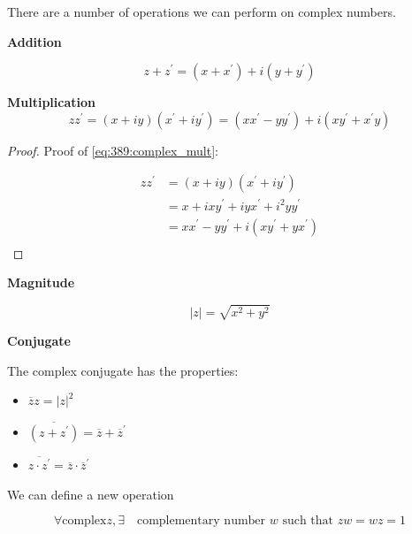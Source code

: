 \documentclass[10pt]{article}
\begin{document}
\begin{definition}

	There are a number of operations we can perform on complex numbers.

	\textbf{Addition} 

	\begin{equation}
		z + z^\prime = (x + x^\prime) + i(y + y^\prime)
		\label{eq:389:complex_add}
	\end{equation}


	\textbf{Multiplication} 
	\begin{equation}
		z z^\prime = (x + iy)(x^\prime + iy^\prime) = (x x^\prime - y y^\prime) + i(x y^\prime + x^\prime y)
		\label{eq:389:complex_mult}
	\end{equation}


	\begin{proof}
		Proof of \eqref{eq:389:complex_mult}:

		\begin{equation}
			\begin{split}
				zz^\prime &= (x+iy)(x^\prime + iy^\prime) \\
				 &= x + ixy^\prime + i yx^\prime + i^2yy^\prime\\
				 &= x x^\prime  - yy^\prime + i(xy^\prime + y x ^\prime) \\
			\end{split}
		\end{equation}
	\end{proof}


	\textbf{Magnitude} 

	\begin{equation}
		|z| = \sqrt{x^2 + y^2}
		\label{eq:389:complex_mag}
	\end{equation}

	\textbf{Conjugate}

	The complex conjugate has the properties:

	\begin{itemize}
		\item $ \overline{z} z = |z|^2 $ 
		\item $ \overline{(z + z^\prime)} = \overline{z} + \overline{z}^\prime$ 
		\item $ \overline{z \cdot z^\prime} = \overline{z} \cdot \overline{z}^\prime $ 
	\end{itemize}


	We can define a new operation

	\begin{equation}
		\forall \text{complex} z, \exists \quad \text{complementary number } w \text{ such that } zw = wz = 1
	\end{equation}


\end{definition}
\end{document}
